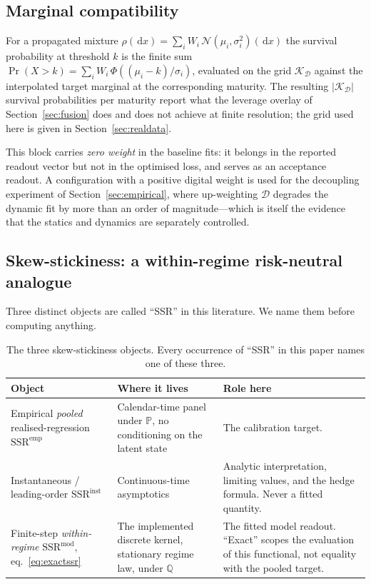 \documentclass[11pt]{article}
\newcommand{\cN}{\mathcal{N}}
\newcommand{\SSR}{\mathrm{SSR}}
\newcommand{\SSRemp}{\SSR^{\mathrm{emp}}}
\newcommand{\SSRmod}{\SSR^{\mathrm{mod}}}
\newcommand{\SSRinst}{\SSR^{\mathrm{inst}}}
\providecommand{\Prob}{\mathbb{P}}
\providecommand{\Qmeas}{\mathbb{Q}}
\providecommand{\1}{\mathbf 1}
\newcommand{\dd}{\,\mathrm{d}}
\begin{document}
\subsection{Marginal compatibility}
\label{sec:rung}

For a propagated mixture $\rho(\dd x)=\sum_i W_i\,\cN(\mu_i,\sigma_i^2)(\dd x)$ the survival
probability at threshold $k$ is the finite sum $\Pr(X>k)=\sum_i W_i\,\Phi((\mu_i-k)/\sigma_i)$,
evaluated on the grid $\mathcal{K}_{\mathcal{D}}$ against the interpolated target marginal at the
corresponding maturity. The resulting $|\mathcal{K}_{\mathcal{D}}|$ survival probabilities per
maturity report what the leverage overlay of Section~\ref{sec:fusion} does and does not achieve at
finite resolution; the grid used here is given in Section~\ref{sec:realdata}.

This block carries \emph{zero weight} in the baseline fits: it belongs in the reported readout
vector but not in the optimised loss, and serves as an acceptance readout. A configuration with a
positive digital weight is used for the decoupling experiment of Section~\ref{sec:empirical}, where
up-weighting $\mathcal D$ degrades the dynamic fit by more than an order of magnitude---which is
itself the evidence that the statics and dynamics are separately
controlled.

\subsection{Skew-stickiness: a within-regime risk-neutral analogue}
\label{sec:ssr}

Three distinct objects are called ``SSR'' in this literature. We name them before computing
anything.

\begin{table}[htbp]
\centering\small
\begin{tabular}{p{} p{} p{}}
\toprule
Object & Where it lives & Role here \\
\midrule
Empirical \emph{pooled} realised-regression $\SSRemp$ &
Calendar-time panel under $\Prob$, no conditioning on the latent state &
The calibration target. \\[2pt]
Instantaneous / leading-order $\SSRinst$ &
Continuous-time asymptotics &
Analytic interpretation, limiting values, and the hedge formula. Never a
fitted quantity. \\[2pt]
Finite-step \emph{within-regime} $\SSRmod$, eq.~\eqref{eq:exactssr} &
The implemented discrete kernel, stationary regime law, under $\Qmeas$ &
The fitted model readout. ``Exact'' scopes the evaluation of this functional, not equality
with the pooled target. \\
\bottomrule
\end{tabular}
\caption{The three skew-stickiness objects. Every occurrence of ``SSR'' in this paper names one
of these three.}
\label{tab:threessr}
\end{table}
\end{document}
